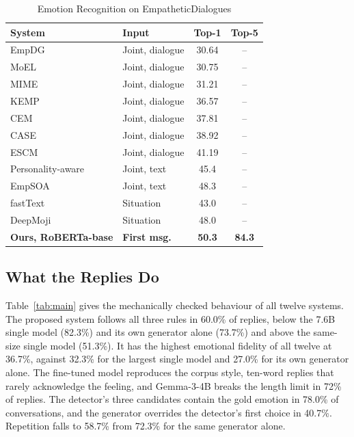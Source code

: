 \documentclass[conference]{IEEEtran}
\begin{document}
\begin{table}[htbp]
\caption{Emotion Recognition on EmpatheticDialogues}
\begin{center}
\begin{tabular}{|l|l|c|c|}
\hline
\textbf{System} & \textbf{Input} & \textbf{Top-1} & \textbf{Top-5} \\
\hline
EmpDG \cite{b6} & Joint, dialogue & 30.64 & -- \\
MoEL \cite{b4} & Joint, dialogue & 30.75 & -- \\
MIME \cite{b5} & Joint, dialogue & 31.21 & -- \\
KEMP \cite{b7} & Joint, dialogue & 36.57 & -- \\
CEM \cite{b8} & Joint, dialogue & 37.81 & -- \\
CASE \cite{b9} & Joint, dialogue & 38.92 & -- \\
ESCM \cite{b10} & Joint, dialogue & 41.19 & -- \\
Personality-aware \cite{b14} & Joint, text & 45.4 & -- \\
EmpSOA \cite{b14} & Joint, text & 48.3 & -- \\
fastText \cite{b20} & Situation & 43.0 & -- \\
DeepMoji \cite{b20} & Situation & 48.0 & -- \\
\hline
\textbf{Ours, RoBERTa-base} & \textbf{First msg.} & \textbf{50.3} & \textbf{84.3} \\
\hline
\end{tabular}
\label{tab:published}
\end{center}
\end{table}

\subsection{What the Replies Do}
Table~\ref{tab:main} gives the mechanically checked behaviour of all twelve systems. The proposed system follows all three rules in 60.0\% of replies, below the 7.6B single model (82.3\%) and its own generator alone (73.7\%) and above the same-size single model (51.3\%). It has the highest emotional fidelity of all twelve at 36.7\%, against 32.3\% for the largest single model and 27.0\% for its own generator alone. The fine-tuned model reproduces the corpus style, ten-word replies that rarely acknowledge the feeling, and Gemma-3-4B breaks the length limit in 72\% of replies. The detector's three candidates contain the gold emotion in 78.0\% of conversations, and the generator overrides the detector's first choice in 40.7\%. Repetition falls to 58.7\% from 72.3\% for the same generator alone.
\end{document}
